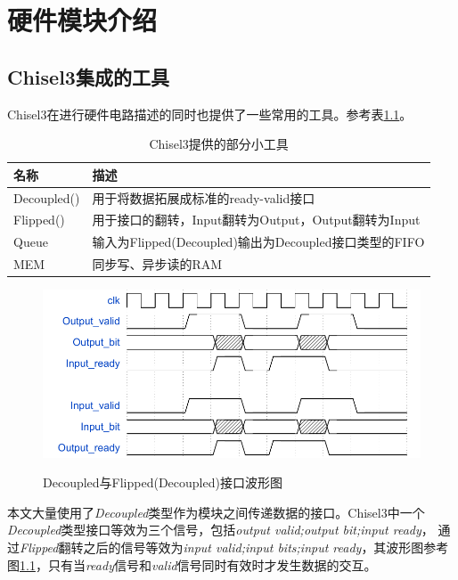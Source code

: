 \chapter{硬件模块介绍}
\section{Chisel3集成的工具}
Chisel3在进行硬件电路描述的同时也提供了一些常用的工具。参考表\ref{chisel-tool}。
\begin{table}[h] %
    \centering
    \caption{Chisel3提供的部分小工具} %
    \begin{tabular}{l|l} %
    \hline  
    \hline  
    名称 & 描述 \\ %
    \hline %
    Decoupled() & 用于将数据拓展成标准的ready-valid接口 \\  
    \hline %
    Flipped() & 用于接口的翻转，Input翻转为Output，Output翻转为Input \\  
    \hline  
    Queue & 输入为Flipped(Decoupled)输出为Decoupled接口类型的FIFO \\  
    \hline  
    MEM & 同步写、异步读的RAM \\  
    \hline  
    \hline  
    \end{tabular}  
    \label{chisel-tool}
\end{table}  
\begin{figure}[h]
    \centering
    \includegraphics{../pdf/decoupled.pdf}\\
    \caption{Decoupled与Flipped(Decoupled)接口波形图}
    \label{decoupled_w}
\end{figure}

本文大量使用了\emph{Decoupled}类型作为模块之间传递数据的接口。Chisel3中一个\emph{Decoupled}类型接口等效为三个信号，包括\emph{output valid;output bit;input ready}，
通过\emph{Flipped}翻转之后的信号等效为\emph{input valid;input bits;input ready}，其波形图参考图\ref{decoupled_w}，只有当\emph{ready}信号和\emph{valid}信号同时有效时才发生数据的交互。

